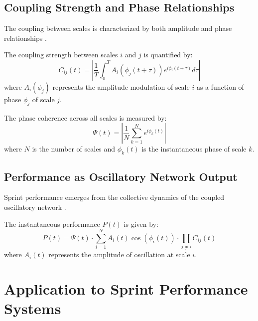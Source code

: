 \documentclass[twocolumn]{article}
\begin{document}
\subsection{Coupling Strength and Phase Relationships}

The coupling between scales is characterized by both amplitude and phase relationships \citep{tort2010measuring}.

\begin{definition}
The coupling strength between scales $i$ and $j$ is quantified by:
\begin{equation}
C_{ij}(t) = \left|\frac{1}{T} \int_0^T A_i(\phi_j(t+\tau)) e^{i\phi_i(t+\tau)} d\tau\right|
\label{eq:coupling_strength}
\end{equation}
where $A_i(\phi_j)$ represents the amplitude modulation of scale $i$ as a function of phase $\phi_j$ of scale $j$.
\end{definition}

\begin{definition}
The phase coherence across all scales is measured by:
\begin{equation}
\Psi(t) = \left|\frac{1}{N}\sum_{k=1}^{N} e^{i\phi_k(t)}\right|
\label{eq:phase_coherence}
\end{equation}
where $N$ is the number of scales and $\phi_k(t)$ is the instantaneous phase of scale $k$.
\end{definition}

\subsection{Performance as Oscillatory Network Output}

Sprint performance emerges from the collective dynamics of the coupled oscillatory network \citep{strogatz2014nonlinear}.

\begin{definition}
The instantaneous performance $P(t)$ is given by:
\begin{equation}
P(t) = \Psi(t) \cdot \sum_{i=1}^{N} A_i(t) \cos(\phi_i(t)) \cdot \prod_{j \neq i} C_{ij}(t)
\label{eq:performance_function}
\end{equation}
where $A_i(t)$ represents the amplitude of oscillation at scale $i$.
\end{definition}

\section{Application to Sprint Performance Systems}
\end{document}
